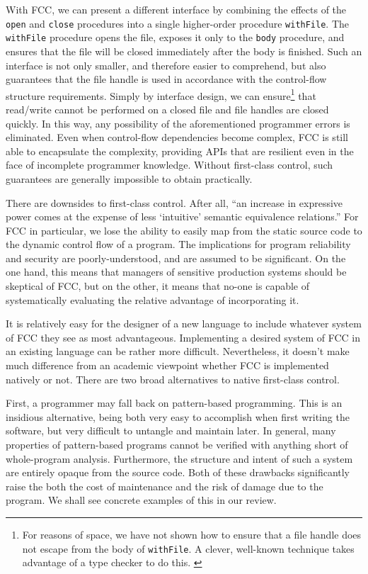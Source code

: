 \documentclass[11pt]{article}
\begin{document}
With FCC, we can present a different interface by combining the effects of the \texttt{open} and \texttt{close} procedures into a single higher-order procedure \texttt{withFile}.
The \texttt{withFile} procedure opens the file, exposes it only to the \texttt{body} procedure, and ensures that the file will be closed immediately after the body is finished.
Such an interface is not only smaller, and therefore easier to comprehend, but also guarantees that the file handle is used in accordance with the control-flow structure requirements.
Simply by interface design, we can ensure\footnote{For reasons of space, we have not shown how to ensure that a file handle does not escape from the body of \texttt{withFile}. A clever, well-known technique takes advantage of a type checker to do this. \cite{StateInHaskell}} that read/write cannot be performed on a closed file and file handles are closed quickly.
In this way, any possibility of the aforementioned programmer errors is eliminated.
Even when control-flow dependencies become complex, FCC is still able to encapsulate the complexity, providing APIs that are resilient even in the face of incomplete programmer knowledge.
Without first-class control, such guarantees are generally impossible to obtain practically.


There are downsides to first-class control. After all, ``an increase in expressive power comes at the expense of less `intuitive' semantic equivalence relations.''\cite{Felleisen90expressive}
For FCC in particular, we lose the ability to easily map from the static source code to the dynamic control flow of a program.
The implications for program reliability and security are poorly-understood, and are assumed to be significant.
On the one hand, this means that managers of sensitive production systems should be skeptical of FCC, but on the other, it means that no-one is capable of systematically evaluating the relative advantage of incorporating it.

It is relatively easy for the designer of a new language to include whatever system of FCC they see as most advantageous.
Implementing a desired system of FCC in an existing language can be rather more difficult.
Nevertheless, it doesn't make much difference from an academic viewpoint whether FCC is implemented natively or not.
There are two broad alternatives to native first-class control.

First, a programmer may fall back on pattern-based programming.
This is an insidious alternative, being both very easy to accomplish when first writing the software, but very difficult to untangle and maintain later.
In general, many properties of pattern-based programs cannot be verified with anything short of whole-program analysis.
Furthermore, the structure and intent of such a system are entirely opaque from the source code.\cite{Felleisen90expressive}
Both of these drawbacks significantly raise the both the cost of maintenance and the risk of damage due to the program.
We shall see concrete examples of this in our review.
\end{document}
